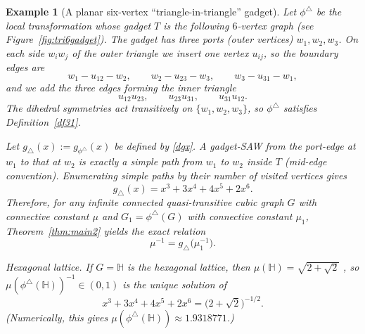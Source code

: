\documentclass[12pt]{amsart}
\theoremstyle{plain}
\newtheorem{example}[theorem]{Example}
\numberwithin{equation}{section}
\numberwithin{theorem}{section}
\numberwithin{figure}{section}
\begin{document}
\begin{example}[A planar six-vertex ``triangle-in-triangle'' gadget]\label{ex:tri6}
Let $\phi^{\triangle}$ be the local transformation whose gadget $T$ is the following
$6$-vertex graph (see Figure~\ref{fig:tri6gadget}).
The gadget has three \emph{ports} (outer vertices) $w_1,w_2,w_3$.
On each side $w_iw_j$ of the outer triangle we insert one vertex $u_{ij}$, so the boundary
edges are
\[
w_1-u_{12}-w_2,\qquad w_2-u_{23}-w_3,\qquad w_3-u_{31}-w_1,
\]
and we add the three edges forming the inner triangle
\[
u_{12}u_{23},\qquad u_{23}u_{31},\qquad u_{31}u_{12}.
\]
The dihedral symmetries act transitively on $\{w_1,w_2,w_3\}$, so $\phi^{\triangle}$
satisfies Definition~\ref{df31}.

Let $g_{\triangle}(x):=g_{\phi^{\triangle}}(x)$ be defined by \eqref{dgx}.  A gadget-SAW
from the port-edge at $w_1$ to that at $w_2$ is exactly a simple path from $w_1$ to $w_2$
inside $T$ (mid-edge convention).  Enumerating simple paths by their number of visited
vertices gives
\[
g_{\triangle}(x)=x^3+3x^4+4x^5+2x^6.
\]
Therefore, for any infinite connected quasi-transitive cubic graph $G$ with connective
constant $\mu$ and $G_1=\phi^{\triangle}(G)$ with connective constant $\mu_1$, Theorem~\ref{thm:main2}
yields the exact relation
\[
\mu^{-1}=g_{\triangle}\!\bigl(\mu_1^{-1}\bigr).
\]

\smallskip
\noindent\emph{Hexagonal lattice.}
If $G=\mathbb H$ is the hexagonal lattice, then $\mu(\mathbb H)=\sqrt{2+\sqrt 2}$ \cite{ds}, so
$\mu(\phi^{\triangle}(\mathbb H))^{-1}\in(0,1)$ is the unique solution of
\[
x^3+3x^4+4x^5+2x^6=\bigl(2+\sqrt 2\bigr)^{-1/2}.
\]
(Numerically, this gives $\mu(\phi^{\triangle}(\mathbb H))\approx 1.9318771$.)
\end{example}
\end{document}
